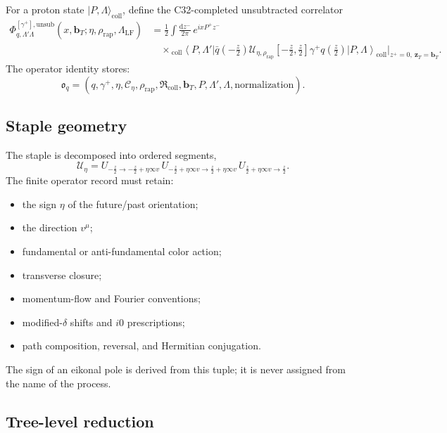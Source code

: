 \documentclass[11pt]{article}
\newcommand{\dd}{\mathrm{d}}
\newcommand{\bT}{\bm b_T}
\newcommand{\cC}{\mathcal C}
\newcommand{\cU}{\mathcal U}
\newcommand{\Coll}{\ensuremath{\mathrm{coll}}}
\newcommand{\Unsub}{\ensuremath{\mathrm{unsub}}}
\begin{document}
For a proton state \(|P,\Lambda\rangle_{\Coll}\), define the C32-completed unsubtracted correlator
\begin{align}
 \Phi_{q,\Lambda'\Lambda}^{[\gamma^+],\Unsub}
 (x,\bT;\eta,\rho_{\mathrm{rap}},\Lambda_{\mathrm{LF}})
 &=
 \frac{1}{2}
 \int\frac{\dd z^-}{2\pi}\,
 e^{ixP^+z^-}
 \nonumber\\
 &\quad\times
 {}_{\Coll}\!\left\langle P,\Lambda'\right|
 \bar q\!\left(-\frac{z}{2}\right)
 \cU_{\eta,\rho_{\mathrm{rap}}}
 \!\left[-\frac{z}{2},\frac{z}{2}\right]
 \gamma^+
 q\!\left(\frac{z}{2}\right)
 \left|P,\Lambda\right\rangle_{\Coll}
 \bigg|_{z^+=0,\ \bm z_T=\bT}.
 \label{eq:unsub-correlator}
\end{align}
The operator identity stores:
\begin{equation}
 \mathfrak o_q
 =
 \left(
 q,\gamma^+,\eta,
 \cC_{\eta},
 \rho_{\mathrm{rap}},
 \mathfrak R_{\Coll},
 \bT,
 P,
 \Lambda',\Lambda,
 \text{normalization}
 \right).
 \label{eq:operator-id}
\end{equation}

\subsection{Staple geometry}

The staple is decomposed into ordered segments,
\begin{equation}
 \cU_{\eta}
 =
 U_{-\frac z2\to -\frac z2+\eta\infty v}\,
 U_{-\frac z2+\eta\infty v\to \frac z2+\eta\infty v}\,
 U_{\frac z2+\eta\infty v\to\frac z2}.
 \label{eq:staple}
\end{equation}
The finite operator record must retain:
\begin{itemize}
\item the sign \(\eta\) of the future/past orientation;
\item the direction \(v^\mu\);
\item fundamental or anti-fundamental color action;
\item transverse closure;
\item momentum-flow and Fourier conventions;
\item modified-\(\delta\) shifts and \(i0\) prescriptions;
\item path composition, reversal, and Hermitian conjugation.
\end{itemize}
The sign of an eikonal pole is derived from this tuple; it is never assigned from the name of the process.

\subsection{Tree-level reduction}
\end{document}
